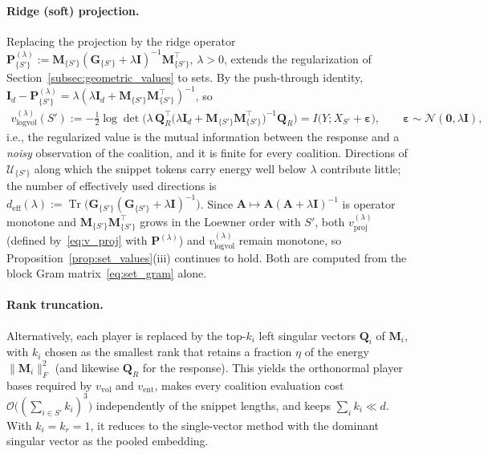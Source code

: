 \documentclass{article}
\begin{document}
\paragraph{Ridge (soft) projection.}
Replacing the projection by the ridge operator $\mathbf{P}^{(\lambda)}_{\{S'\}} := \mathbf{M}_{\{S'\}} (\mathbf{G}_{\{S'\}} + \lambda \mathbf{I})^{-1} \mathbf{M}_{\{S'\}}^\top$, $\lambda > 0$, extends the regularization of Section~\ref{subsec:geometric_values} to sets. By the push-through identity, $\mathbf{I}_d - \mathbf{P}^{(\lambda)}_{\{S'\}} = \lambda (\lambda \mathbf{I}_d + \mathbf{M}_{\{S'\}} \mathbf{M}_{\{S'\}}^\top)^{-1}$, so
\begin{align}\label{eq:set_logvol_ridge}
    v^{(\lambda)}_{\text{logvol}}(S') := -\frac{1}{2} \log \det \Big( \lambda \, \mathbf{Q}_R^\top \big(\lambda \mathbf{I}_d + \mathbf{M}_{\{S'\}} \mathbf{M}_{\{S'\}}^\top\big)^{-1} \mathbf{Q}_R \Big) = I\big(Y; X_{S'} + \boldsymbol{\varepsilon}\big), \qquad \boldsymbol{\varepsilon} \sim \mathcal{N}(\mathbf{0}, \lambda \mathbf{I}),
\end{align}
i.e., the regularized value is the mutual information between the response and a \emph{noisy} observation of the coalition, and it is finite for every coalition. Directions of $\mathcal{U}_{\{S'\}}$ along which the snippet tokens carry energy well below $\lambda$ contribute little; the number of effectively used directions is $d_{\text{eff}}(\lambda) := \operatorname{Tr}\big(\mathbf{G}_{\{S'\}} (\mathbf{G}_{\{S'\}} + \lambda \mathbf{I})^{-1}\big)$. Since $\mathbf{A} \mapsto \mathbf{A}(\mathbf{A} + \lambda \mathbf{I})^{-1}$ is operator monotone and $\mathbf{M}_{\{S'\}} \mathbf{M}_{\{S'\}}^\top$ grows in the Loewner order with $S'$, both $v^{(\lambda)}_{\text{proj}}$ (defined by~\eqref{eq:v_proj} with $\mathbf{P}^{(\lambda)}$) and $v^{(\lambda)}_{\text{logvol}}$ remain monotone, so Proposition~\ref{prop:set_values}(iii) continues to hold. Both are computed from the block Gram matrix~\eqref{eq:set_gram} alone.

\paragraph{Rank truncation.}
Alternatively, each player is replaced by the top-$k_i$ left singular vectors $\mathbf{Q}_i$ of $\mathbf{M}_i$, with $k_i$ chosen as the smallest rank that retains a fraction $\eta$ of the energy $\|\mathbf{M}_i\|_F^2$ (and likewise $\mathbf{Q}_R$ for the response). This yields the orthonormal player bases required by $v_{\text{vol}}$ and $v_{\text{ent}}$, makes every coalition evaluation cost $\mathcal{O}\big((\sum_{i \in S'} k_i)^3\big)$ independently of the snippet lengths, and keeps $\sum_i k_i \ll d$. With $k_i = k_r = 1$, it reduces to the single-vector method with the dominant singular vector as the pooled embedding.
\end{document}
